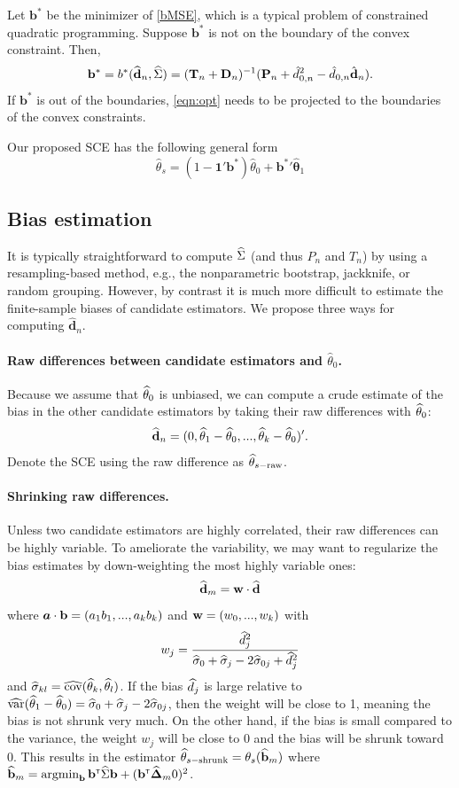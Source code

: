\documentclass{article}
\def\covhat{\widehat{\cov}}
\begin{document}
Let $\mathbf b^*$ be the minimizer of \eqref{bMSE}, which is a typical problem of constrained quadratic programming. Suppose $\mathbf b^*$ is not on the boundary of the convex constraint. Then, 
\begin{equation} \label{eqn:opt}
\mathbf b^* = b^*({\widehat {{\bf d}}}_n, {\widehat\Sigma}) = (\mathbf T_n + \mathbf D_n)^{-1}(\mathbf P_n +\hat d_{0,n}^2 -\hat d_{0,n}\hat{\mathbf d}_n).
\end{equation}
If $\mathbf b^*$ is out of the boundaries, \eqref{eqn:opt} needs to be projected to the boundaries of the convex constraints.  

Our proposed SCE has the following general form
\begin{equation}
\hat\theta_s = (1-\mathbf 1'\mathbf b^*) \hat\theta_0 + \mathbf {b^*}' \boldsymbol{\hat\theta}_1
\end{equation}

\subsection{Bias estimation}
It is typically straightforward to compute ${\widehat\Sigma}$ (and thus $P_n$ and $T_n$) by using a resampling-based method, e.g., the nonparametric bootstrap, jackknife, or random grouping.  However, by contrast it is much more difficult to estimate the finite-sample biases of candidate estimators.  We propose three ways for computing $\boldsymbol {\hat d}_n$.

\paragraph{Raw differences between candidate estimators and $\hat \theta_0$.}
Because we assume that ${\widehat\theta}_0$ is unbiased, we can compute a crude estimate of the bias in the other candidate estimators by taking their raw differences with ${\widehat\theta}_0$:
\[
{\widehat {{\bf d}}}_n = (0, {\widehat\theta}_1 - {\widehat\theta}_0, ..., {\widehat\theta}_k - {\widehat\theta}_0)'.
\]
Denote the SCE using the raw difference as  ${\widehat\theta}_{s-\text{raw}}$.

\paragraph{Shrinking raw differences.}
Unless two candidate estimators are highly correlated, their raw differences can be highly variable. To ameliorate the variability, we may want to regularize the bias estimates by down-weighting the most highly variable ones: 
\[
{\widehat {{\bf d}}}_m = {\bf w} \cdot {\widehat {{\bf d}}}
\]
where ${\mbox{\boldmath$a$}} \cdot {\bf b} = (a_1b_1, ..., a_kb_k)$ and ${\bf w} = (w_0, ..., w_k)$ with
\[
w_j = \frac{{\widehat d}_j^2}{{\widehat\sigma}_0 + {\widehat\sigma}_j - 2{\widehat\sigma}_{0j} + {\widehat d}_j^2}
\]
and $\sigmahat_{kl} = \covhat(\thetahat_k, \thetahat_l)$. 
If the bias ${\widehat d}_j$ is large relative to $\widehat{\mbox{var}}({\widehat\theta}_1 - {\widehat\theta}_0) = {\widehat\sigma}_0 + {\widehat\sigma}_j - 2{\widehat\sigma}_{0j}$, then the weight will be close to 1, meaning the bias is not shrunk very much. On the other hand, if the bias is small compared to the variance, the weight $w_j$ will be close to 0 and the bias will be shrunk toward 0. This results in the estimator ${\widehat\theta}_{s-\text{shrunk}} = \theta_s({\widehat {{\bf b}}}_m)$ where ${\widehat {{\bf b}}}_m = \mathop{\mbox{argmin}}_{{\bf b}}{\bf b}^{{\sf \scriptscriptstyle{T}}}{\widehat\Sigma}{\bf b} + ({\bf b}^{{\sf \scriptscriptstyle{T}}} {\widehat{\boldsymbol{\Delta}}}_m0)^2$.
\end{document}
